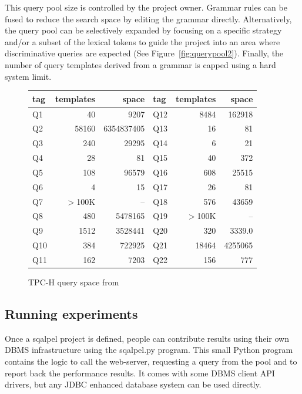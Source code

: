 \documentclass{cidr-2019}
\begin{document}

This query pool size is controlled by the project owner. Grammar rules can be
fused to reduce the search space by editing the grammar directly.
Alternatively, the query pool can be selectively expanded by focusing
on a specific strategy and/or a subset of the lexical tokens to guide
the project into an area where discriminative queries are expected
(See Figure~\ref{fig:querypool2}). Finally, the number of query
templates derived from a grammar is capped using a hard system limit.
\begin{figure}[t]
{\small \begin{tabular}{ | l r r | l r r |}\hline tag & templates &
    space & tag & templates & space\\\hline Q1 & 40 & 9207 & Q12 &
    8484 & 162918 \\ Q2 & 58160 & 6354837405 & Q13 & 16 & 81\\ Q3 &
    240 & 29295 & Q14 & 6 & 21\\ Q4 & 28 & 81 & Q15 & 40 & 372 \\ Q5 &
    108 & 96579 & Q16 & 608 & 25515\\ Q6 & 4 & 15 & Q17 & 26 & 81
    \\ Q7 & $>$100K & -- & Q18 & 576 & 43659\\ Q8 & 480 & 5478165 &
    Q19 & $>$100K & --\\ Q9 & 1512 & 3528441 & Q20 & 320 &
    3339.0\\ Q10 & 384 & 722925 & Q21 & 18464 & 4255065 \\ Q11 & 162 &
    7203 & Q22 & 156& 777\\ \hline
	\end{tabular}
	\caption{TPC-H query space from
          \cite{DBLP:conf/sigmod/KerstenKZ18}\label{table:tpch-count}}}
\end{figure}

\subsection{Running experiments}

Once a {\sc sqalpel} project is defined, people can contribute results
using their own DBMS infrastructure using the {\sc sqalpel.py}
program. This small Python program contains the logic to call the
web-server, requesting a query from the pool and to report back the
performance results. It comes with some DBMS client API drivers, but
any JDBC enhanced database system can be used directly.
\end{document}
